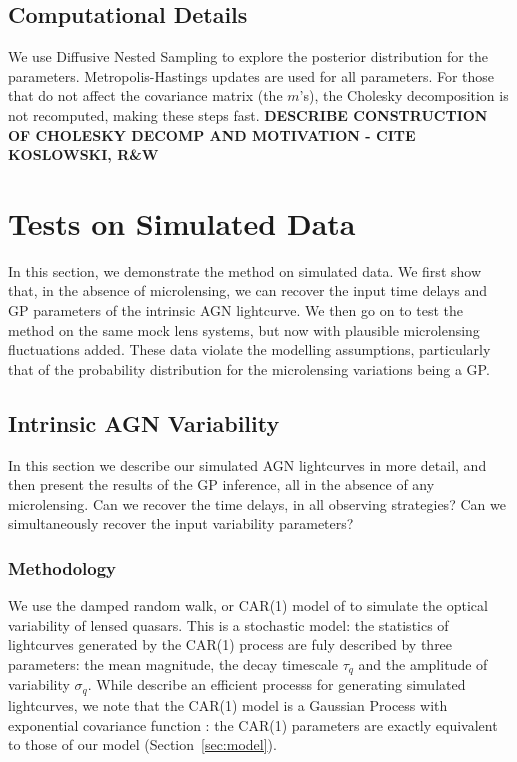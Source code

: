 \documentclass[useAMS,usenatbib, a4paper]{mn2e} \usepackage{natbib}
\begin{document}
\subsection{Computational Details}

We use Diffusive Nested Sampling \citep{dnest} to explore the posterior
distribution for the parameters. Metropolis-Hastings updates are used for all
parameters. For those that do not affect the covariance matrix (the $m$'s),
the Cholesky decomposition is not recomputed, making these steps fast. {\bf
DESCRIBE CONSTRUCTION OF CHOLESKY DECOMP AND MOTIVATION - CITE KOSLOWSKI,
R\&W}



\section{Tests on Simulated Data}\label{simdata}

In this section, we demonstrate the method on simulated data. We first show
that, in the absence of microlensing, we can recover the input time delays and
GP parameters of the intrinsic AGN lightcurve. We then go on to test the
method on the same mock lens systems, but now with plausible microlensing
fluctuations added. These data violate the modelling assumptions, particularly
that of the probability distribution for the microlensing variations being a
GP. 


\subsection{Intrinsic AGN Variability}

In this section we describe our simulated AGN lightcurves in more detail, and
then present the results of the GP inference, all in the absence of any
microlensing. Can we recover the time delays, in all observing strategies? Can
we simultaneously recover the input variability parameters?

\subsubsection{Methodology}

We use the damped random walk, or CAR(1) model of \citet{Kel++09} to simulate
the optical variability of lensed quasars. This is a stochastic model: the
statistics of lightcurves generated by the CAR(1) process are fuly described
by three parameters: the mean magnitude, the decay timescale $\tau_q$ and the
amplitude of  variability $\sigma_q$. While \citeauthor{Kel++09} describe an
efficient processs for generating simulated lightcurves,  we note that the
CAR(1) model is a Gaussian Process with exponential covariance function
\citep{Zu++10}: the CAR(1) parameters are exactly equivalent to those of our
model (Section~\ref{sec:model}). 
\end{document}
